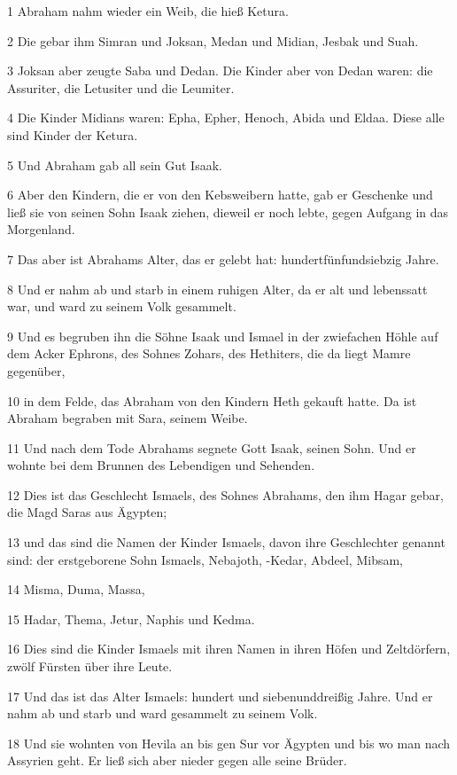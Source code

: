 \par 1 Abraham nahm wieder ein Weib, die hieß Ketura.
\par 2 Die gebar ihm Simran und Joksan, Medan und Midian, Jesbak und Suah.
\par 3 Joksan aber zeugte Saba und Dedan. Die Kinder aber von Dedan waren: die Assuriter, die Letusiter und die Leumiter.
\par 4 Die Kinder Midians waren: Epha, Epher, Henoch, Abida und Eldaa. Diese alle sind Kinder der Ketura.
\par 5 Und Abraham gab all sein Gut Isaak.
\par 6 Aber den Kindern, die er von den Kebsweibern hatte, gab er Geschenke und ließ sie von seinen Sohn Isaak ziehen, dieweil er noch lebte, gegen Aufgang in das Morgenland.
\par 7 Das aber ist Abrahams Alter, das er gelebt hat: hundertfünfundsiebzig Jahre.
\par 8 Und er nahm ab und starb in einem ruhigen Alter, da er alt und lebenssatt war, und ward zu seinem Volk gesammelt.
\par 9 Und es begruben ihn die Söhne Isaak und Ismael in der zwiefachen Höhle auf dem Acker Ephrons, des Sohnes Zohars, des Hethiters, die da liegt Mamre gegenüber,
\par 10 in dem Felde, das Abraham von den Kindern Heth gekauft hatte. Da ist Abraham begraben mit Sara, seinem Weibe.
\par 11 Und nach dem Tode Abrahams segnete Gott Isaak, seinen Sohn. Und er wohnte bei dem Brunnen des Lebendigen und Sehenden.
\par 12 Dies ist das Geschlecht Ismaels, des Sohnes Abrahams, den ihm Hagar gebar, die Magd Saras aus Ägypten;
\par 13 und das sind die Namen der Kinder Ismaels, davon ihre Geschlechter genannt sind: der erstgeborene Sohn Ismaels, Nebajoth, -Kedar, Abdeel, Mibsam,
\par 14 Misma, Duma, Massa,
\par 15 Hadar, Thema, Jetur, Naphis und Kedma.
\par 16 Dies sind die Kinder Ismaels mit ihren Namen in ihren Höfen und Zeltdörfern, zwölf Fürsten über ihre Leute.
\par 17 Und das ist das Alter Ismaels: hundert und siebenunddreißig Jahre. Und er nahm ab und starb und ward gesammelt zu seinem Volk.
\par 18 Und sie wohnten von Hevila an bis gen Sur vor Ägypten und bis wo man nach Assyrien geht. Er ließ sich aber nieder gegen alle seine Brüder.

